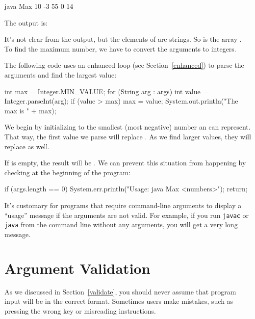 \begin{stdout}
java Max 10 -3 55 0 14
\end{stdout}

The output is:

\begin{stdout}
[10, -3, 55, 0, 14]
\end{stdout}

It's not clear from the output, but the elements of  are strings.
So  is the array .
To find the maximum number, we have to convert the arguments to integers.

The following code uses an enhanced  loop (see Section~\ref{enhanced}) to parse the arguments and find the largest value:

\begin{code}
int max = Integer.MIN_VALUE;
for (String arg : args) {
    int value = Integer.parseInt(arg);
    if (value > max) {
        max = value;
    }
}
System.out.println("The max is " + max);
\end{code}

We begin by initializing  to the smallest (most negative) number an  can represent.
That way, the first value we parse will replace .
As we find larger values, they will replace  as well.

If  is empty, the result will be .
We can prevent this situation from happening by checking  at the beginning of the program:

\begin{code}
if (args.length == 0) {
    System.err.println("Usage: java Max <numbers>");
    return;
}
\end{code}

It's customary for programs that require command-line arguments to display a ``usage'' message if the arguments are not valid.
For example, if you run {\tt javac} or {\tt java} from the command line without any arguments, you will get a very long message.


\section{Argument Validation}

As we discussed in Section~\ref{validate}, you should never assume that program input will be in the correct format.
Sometimes users make mistakes, such as pressing the wrong key or misreading instructions.

